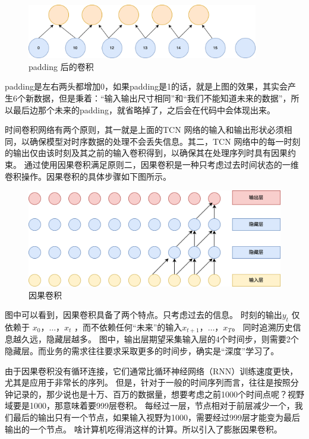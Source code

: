 \begin{figure}[htbp]
	\centering
	\includegraphics[width=0.9\textwidth]{figures/convolution_2.png}
	\caption{padding 后的卷积}
\end{figure}

padding是左右两头都增加0，如果padding是1的话，就是上图的效果，其实会产生6个新数据，但是秉着：“输入输出尺寸相同”和“我们不能知道未来的数据”，所以最后边那个未来的padding，就省略掉了，之后会在代码中会体现出来。

时间卷积网络有两个原则，其一就是上面的TCN 网络的输入和输出形状必须相同，以确保模型对时序数据的处理不会丢失信息。其二，TCN 网络中的每一时刻的输出仅由该时刻及其之前的输入卷积得到，以确保其在处理序列时具有因果约束。
通过使用因果卷积满足原则二，因果卷积是一种只考虑过去时间状态的一维卷积操作。因果卷积的具体步骤如下图所示。

\begin{figure}[htbp]
	\centering
	\includegraphics[width=\textwidth]{figures/causal_convolution.png}
	\caption{因果卷积}
\end{figure}

图中可以看到，因果卷积具备了两个特点。只考虑过去的信息。 时刻的输出$y_t$ 仅依赖于 $x_0\text{，} \dots \text{，}x_t$ ，而不依赖任何“未来”的输入$x_{t+1} \text{，} \dots \text{，}x_T$。
同时追溯历史信息越久远，隐藏层越多。 图中，输出层期望采集输入层的4个时间步，则需要2个隐藏层。而业务的需求往往要求采取更多的时间步，确实是“深度”学习了。

由于因果卷积没有循环连接，它们通常比循环神经网络（RNN）训练速度更快，尤其是应用于非常长的序列。
但是，针对于一般的时间序列而言，往往是按照分钟记录的，那少说也是十万、百万的数据量，想要考虑之前1000个时间点呢？视野域要是1000，那意味着要999层卷积。
每经过一层，节点相对于前层减少一个，我们最后的输出只有一个节点，如果输入视野为1000，需要经过999层才能变为最后输出的一个节点。
啥计算机吃得消这样的计算。所以引入了膨胀因果卷积。



